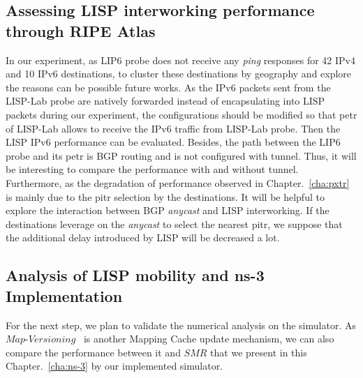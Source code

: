\subsection{Assessing LISP interworking performance through RIPE Atlas}
In our experiment, as LIP6 probe does not receive any \emph{ping} responses for 42 IPv4 and 10 IPv6 destinations, to cluster these destinations by geography and explore the reasons can be possible future works. As the IPv6 packets sent from the LISP-Lab probe are natively forwarded instead of encapsulating into LISP packets during our experiment, the configurations should be modified so that \acrshort{petr} of LISP-Lab allows to receive the IPv6 traffic from LISP-Lab probe. Then the LISP IPv6 performance can be evaluated. Besides, the path between the LIP6 probe and its \acrshort{petr} is BGP routing and is not configured with tunnel. Thus, it will be interesting to compare the performance with and without tunnel. Furthermore, as the degradation of performance observed in Chapter.~\ref{cha:pxtr} is mainly due to the \acrshort{pitr} selection by the destinations. It will be helpful to explore the interaction between BGP \emph{anycast} and LISP interworking. If the destinations leverage on the \emph{anycast} to select the nearest \acrshort{pitr}, we suppose that the additional delay introduced by LISP will be decreased a lot.

\subsection{Analysis of LISP mobility and ns-3 Implementation}
For the next step, we plan to validate the numerical analysis on the simulator. As $Map\textbf{-}Versioning$~\cite{rfc6834} is another Mapping Cache update mechanism, we can also compare the performance between it and $SMR$ that we present in this Chapter.~\ref{cha:ns-3} by our implemented simulator. 

